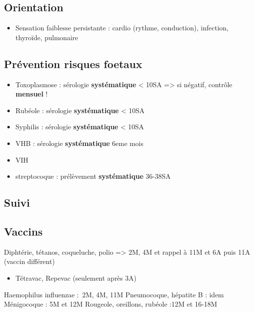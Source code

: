 \documentclass[11pt]{article}
\begin{document}
\subsection{Orientation}
\label{sec:orgeaa46a5}
\begin{itemize}
\item Sensation faiblesse persistante : cardio (rythme, conduction), infection, thyroïde, pulmonaire
\end{itemize}
\subsection{Prévention risques foetaux}
\label{sec:org2a938f7}
\begin{itemize}
\item Toxoplasmose : sérologie \textbf{systématique} < 10SA => si négatif, contrôle \textbf{mensuel} !
\item Rubéole : sérologie \textbf{systématique} < 10SA
\item Syphilis : sérologie \textbf{systématique} < 10SA
\item VHB : sérologie \textbf{systématique} 6eme mois
\item VIH
\item streptocoque : prélèvement \textbf{systématique} 36-38SA
\end{itemize}

\subsection{Suivi}
\label{sec:orgf555f0a}
\subsection{Vaccins}
\label{sec:org02cfa4e}
Diphtérie, tétanos, coqueluche, polio => 2M, 4M et rappel à 11M et 6A puis 11A
(vaccin différent)
\begin{itemize}
\item Tétravac, Repevac (seulement après 3A)
\end{itemize}
Haemophilus influenzae : 2M, 4M, 11M
Pneumocoque, hépatite B : idem
Ménigocoque : 5M et 12M
Rougeole, oreillons, rubéole :12M et 16-18M
\end{document}
